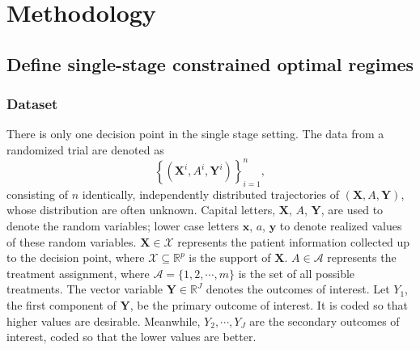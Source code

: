 \documentclass{article}
\newcommand{\bs}{ \boldsymbol}
\newcommand{\mb}{\mathbb}
\newcommand{\ml}{\mathcal}
\newcommand{\lt}{\left}
\newcommand{\rt}{\right}
\begin{document}
 \section{Methodology}
\subsection{Define single-stage constrained optimal regimes}
\subsubsection{Dataset} 
There is only one decision point in the single stage setting. The data from a randomized trial are denoted as
$$\lt\{\lt(\bs{X}^i, A^i, \bs{Y}^i\rt)\rt\}_{i=1}^n,$$ 
consisting of $n$  identically, independently distributed trajectories of $\lt(\bs{X}, A, \bs{Y}\rt)$, whose distribution are often unknown. Capital letters, $\bs{X}$, $A$, $\bs{Y}$, are used to denote the random variables; lower case letters $\bs{x}$, $a$, $\bs{y}$ to denote realized values of these random variables.  $\bs{X} \in \bs{\ml{X}}$ represents the patient information collected up to the decision point, where $\bs{\ml{X}} \subseteq \mb{R}^{p}$ is the support of $\bs{X}$. $A \in \ml{A}$ represents the treatment assignment, where $\ml{A} = \{1,2, \cdots, m\}$ is the set of all possible treatments. The vector variable $\bs{Y} \in \mb{R}^J$ denotes the outcomes of interest. Let $Y_1$, the first component of $\bs{Y}$, be the primary outcome of interest. It is coded so that higher values are desirable. Meanwhile, $Y_2, \cdots, Y_J$ are the secondary outcomes of interest, coded so that the lower values are better. 
\end{document}
